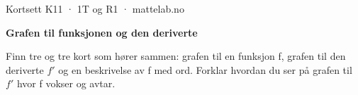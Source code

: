 \documentclass[11pt,a4paper]{article}
\begin{document}
\begin{minipage}[t]{0.8\linewidth}\vspace{0pt}
{\sffamily\small\color{dempet}Kortsett K11 · 1T og R1 · mattelab.no}\par\vspace{0.25em}
{\fontsize{20}{24}\selectfont\bfseries Grafen til funksjonen og den deriverte}\par\vspace{0.5em}
Finn tre og tre kort som hører sammen: grafen til en funksjon f, grafen til den deriverte $f'$ og en beskrivelse av f med ord. Forklar hvordan du ser på grafen til $f'$ hvor f vokser og avtar.\par{}
\end{minipage}\hfill
\begin{minipage}[t]{0.15\linewidth}\vspace{0pt}\raggedleft
{}
\end{minipage}\par\vspace{0.8em}
\end{document}
